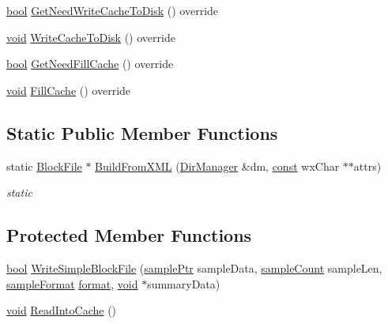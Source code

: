 \begin{DoxyCompactItemize}
\hyperlink{mac_2config_2i386_2lib-src_2libsoxr_2soxr-config_8h_abb452686968e48b67397da5f97445f5b}{bool} \hyperlink{class_simple_block_file_abc2e6b30cab196f8bdd325c586176375}{Get\+Need\+Write\+Cache\+To\+Disk} () override
\item 
\hyperlink{sound_8c_ae35f5844602719cf66324f4de2a658b3}{void} \hyperlink{class_simple_block_file_a2c6893a7505bab05c0baac204f68ff1d}{Write\+Cache\+To\+Disk} () override
\item 
\hyperlink{mac_2config_2i386_2lib-src_2libsoxr_2soxr-config_8h_abb452686968e48b67397da5f97445f5b}{bool} \hyperlink{class_simple_block_file_ab7a5974aa345db6e27da33bf535a4c4c}{Get\+Need\+Fill\+Cache} () override
\item 
\hyperlink{sound_8c_ae35f5844602719cf66324f4de2a658b3}{void} \hyperlink{class_simple_block_file_a6bc1e4d2f9dcc7783f12447a768850b6}{Fill\+Cache} () override
\end{DoxyCompactItemize}
\subsection*{Static Public Member Functions}
\begin{DoxyCompactItemize}
\item 
static \hyperlink{class_block_file}{Block\+File} $\ast$ \hyperlink{class_simple_block_file_a9aba59fe42619754b5976ed85af2a194}{Build\+From\+X\+ML} (\hyperlink{class_dir_manager}{Dir\+Manager} \&dm, \hyperlink{getopt1_8c_a2c212835823e3c54a8ab6d95c652660e}{const} wx\+Char $\ast$$\ast$attrs)
\begin{DoxyCompactList}\small\item\em static \end{DoxyCompactList}\end{DoxyCompactItemize}
\subsection*{Protected Member Functions}
\begin{DoxyCompactItemize}
\item 
\hyperlink{mac_2config_2i386_2lib-src_2libsoxr_2soxr-config_8h_abb452686968e48b67397da5f97445f5b}{bool} \hyperlink{class_simple_block_file_a80703489b7ca1677e8823273f5537c9c}{Write\+Simple\+Block\+File} (\hyperlink{include_2audacity_2_types_8h_aaafb46d1caf7c79262fec96b577215fe}{sample\+Ptr} sample\+Data, \hyperlink{include_2audacity_2_types_8h_afa427e1f521ea5ec12d054e8bd4d0f71}{sample\+Count} sample\+Len, \hyperlink{include_2audacity_2_types_8h_a9938d2e2f6adef23e745cd80ef379792}{sample\+Format} \hyperlink{_export_p_c_m_8cpp_a317afff57d87a89158c2b038d37b2b08}{format}, \hyperlink{sound_8c_ae35f5844602719cf66324f4de2a658b3}{void} $\ast$summary\+Data)
\item 
\hyperlink{sound_8c_ae35f5844602719cf66324f4de2a658b3}{void} \hyperlink{class_simple_block_file_a7d5c2132162fed40b81a09c3ef7fd8a0}{Read\+Into\+Cache} ()
\end{DoxyCompactItemize}
